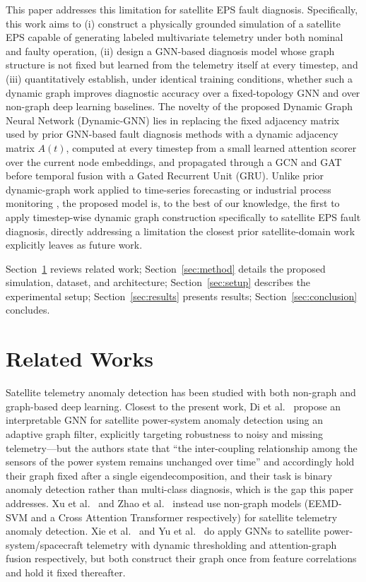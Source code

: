 \documentclass[conference]{IEEEtran}
\begin{document}
This paper addresses this limitation for satellite EPS fault diagnosis. Specifically, this
work aims to (i) construct a physically grounded simulation of a satellite EPS capable of
generating labeled multivariate telemetry under both nominal and faulty operation, (ii) design
a GNN-based diagnosis model whose graph structure is not fixed but learned from the telemetry
itself at every timestep, and (iii) quantitatively establish, under identical training
conditions, whether such a dynamic graph improves diagnostic accuracy over a fixed-topology
GNN and over non-graph deep learning baselines. The novelty of the proposed Dynamic Graph
Neural Network (Dynamic-GNN) lies in replacing the fixed adjacency matrix used by prior
GNN-based fault diagnosis methods \cite{b1,b4,b6} with a dynamic adjacency matrix $A(t)$,
computed at every timestep from a small learned attention scorer over the current node
embeddings, and propagated through a GCN and GAT before temporal fusion with a Gated Recurrent
Unit (GRU). Unlike prior dynamic-graph work applied to time-series forecasting or industrial
process monitoring \cite{b13}, the proposed model is, to the best of our knowledge,
the first to apply timestep-wise dynamic graph construction specifically to satellite EPS
fault diagnosis, directly addressing a limitation the closest prior satellite-domain work
explicitly leaves as future work.

Section~\ref{sec:related} reviews related work; Section~\ref{sec:method} details the proposed
simulation, dataset, and architecture; Section~\ref{sec:setup} describes the experimental
setup; Section~\ref{sec:results} presents results; Section~\ref{sec:conclusion} concludes.

\section{Related Works}
\label{sec:related}

Satellite telemetry anomaly detection has been studied with both non-graph and graph-based
deep learning. Closest to the present work, Di et al.~\cite{bdi} propose an interpretable GNN
for satellite power-system anomaly detection using an adaptive graph filter, explicitly
targeting robustness to noisy and missing telemetry---but the authors state that ``the
inter-coupling relationship among the sensors of the power system remains unchanged over
time'' and accordingly hold their graph fixed after a single eigendecomposition, and their
task is binary anomaly detection rather than multi-class diagnosis, which is the gap this
paper addresses. Xu et al.~\cite{b4} and Zhao et al.~\cite{b5} instead use non-graph models
(EEMD-SVM and a Cross Attention Transformer respectively) for satellite telemetry anomaly
detection. Xie et al.~\cite{b2} and Yu et al.~\cite{b3} do apply GNNs to satellite
power-system/spacecraft telemetry with dynamic thresholding and attention-graph fusion
respectively, but both construct their graph once from feature correlations and hold it fixed
thereafter.
\end{document}
